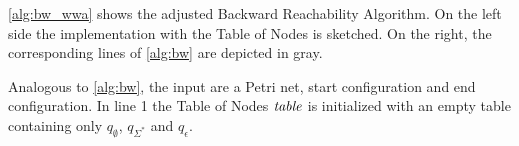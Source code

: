 \autoref{alg:bw_wwa} shows the adjusted Backward Reachability Algorithm. On the left side the implementation with the Table of Nodes is sketched. On the right, the corresponding lines of \autoref{alg:bw} are depicted in gray.

\par 

Analogous to \autoref{alg:bw}, the input are a Petri net, start configuration and end configuration. In line 1 the Table of Nodes $\mathit{table}$ is initialized with an empty table containing only $q_{\emptyset}$, $q_{\Sigma^{*}}$ and $q_{\epsilon}$. 


\newenvironment{algocolor}{%
   \color{gray}
}{}

